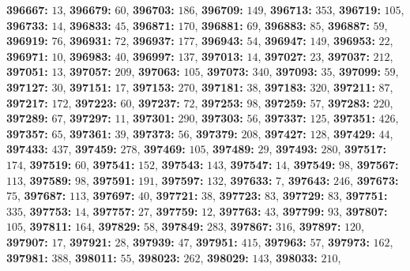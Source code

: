 \textsf{\bfseries 396667:} $13$, \textsf{\bfseries 396679:} $60$, \textsf{\bfseries 396703:} $186$, \textsf{\bfseries 396709:} $149$, \textsf{\bfseries 396713:} $353$, \textsf{\bfseries 396719:} $105$, \textsf{\bfseries 396733:} $14$, \textsf{\bfseries 396833:} $45$, \textsf{\bfseries 396871:} $170$, \textsf{\bfseries 396881:} $69$, \textsf{\bfseries 396883:} $85$, \textsf{\bfseries 396887:} $59$, \textsf{\bfseries 396919:} $76$, \textsf{\bfseries 396931:} $72$, \textsf{\bfseries 396937:} $177$, \textsf{\bfseries 396943:} $54$, \textsf{\bfseries 396947:} $149$, \textsf{\bfseries 396953:} $22$, \textsf{\bfseries 396971:} $10$, \textsf{\bfseries 396983:} $40$, \textsf{\bfseries 396997:} $137$, \textsf{\bfseries 397013:} $14$, \textsf{\bfseries 397027:} $23$, \textsf{\bfseries 397037:} $212$, \textsf{\bfseries 397051:} $13$, \textsf{\bfseries 397057:} $209$, \textsf{\bfseries 397063:} $105$, \textsf{\bfseries 397073:} $340$, \textsf{\bfseries 397093:} $35$, \textsf{\bfseries 397099:} $59$, \textsf{\bfseries 397127:} $30$, \textsf{\bfseries 397151:} $17$, \textsf{\bfseries 397153:} $270$, \textsf{\bfseries 397181:} $38$, \textsf{\bfseries 397183:} $320$, \textsf{\bfseries 397211:} $87$, \textsf{\bfseries 397217:} $172$, \textsf{\bfseries 397223:} $60$, \textsf{\bfseries 397237:} $72$, \textsf{\bfseries 397253:} $98$, \textsf{\bfseries 397259:} $57$, \textsf{\bfseries 397283:} $220$, \textsf{\bfseries 397289:} $67$, \textsf{\bfseries 397297:} $11$, \textsf{\bfseries 397301:} $290$, \textsf{\bfseries 397303:} $56$, \textsf{\bfseries 397337:} $125$, \textsf{\bfseries 397351:} $426$, \textsf{\bfseries 397357:} $65$, \textsf{\bfseries 397361:} $39$, \textsf{\bfseries 397373:} $56$, \textsf{\bfseries 397379:} $208$, \textsf{\bfseries 397427:} $128$, \textsf{\bfseries 397429:} $44$, \textsf{\bfseries 397433:} $437$, \textsf{\bfseries 397459:} $278$, \textsf{\bfseries 397469:} $105$, \textsf{\bfseries 397489:} $29$, \textsf{\bfseries 397493:} $280$, \textsf{\bfseries 397517:} $174$, \textsf{\bfseries 397519:} $60$, \textsf{\bfseries 397541:} $152$, \textsf{\bfseries 397543:} $143$, \textsf{\bfseries 397547:} $14$, \textsf{\bfseries 397549:} $98$, \textsf{\bfseries 397567:} $113$, \textsf{\bfseries 397589:} $98$, \textsf{\bfseries 397591:} $191$, \textsf{\bfseries 397597:} $132$, \textsf{\bfseries 397633:} $7$, \textsf{\bfseries 397643:} $246$, \textsf{\bfseries 397673:} $75$, \textsf{\bfseries 397687:} $113$, \textsf{\bfseries 397697:} $40$, \textsf{\bfseries 397721:} $38$, \textsf{\bfseries 397723:} $83$, \textsf{\bfseries 397729:} $83$, \textsf{\bfseries 397751:} $335$, \textsf{\bfseries 397753:} $14$, \textsf{\bfseries 397757:} $27$, \textsf{\bfseries 397759:} $12$, \textsf{\bfseries 397763:} $43$, \textsf{\bfseries 397799:} $93$, \textsf{\bfseries 397807:} $105$, \textsf{\bfseries 397811:} $164$, \textsf{\bfseries 397829:} $58$, \textsf{\bfseries 397849:} $283$, \textsf{\bfseries 397867:} $316$, \textsf{\bfseries 397897:} $120$, \textsf{\bfseries 397907:} $17$, \textsf{\bfseries 397921:} $28$, \textsf{\bfseries 397939:} $47$, \textsf{\bfseries 397951:} $415$, \textsf{\bfseries 397963:} $57$, \textsf{\bfseries 397973:} $162$, \textsf{\bfseries 397981:} $388$, \textsf{\bfseries 398011:} $55$, \textsf{\bfseries 398023:} $262$, \textsf{\bfseries 398029:} $143$, \textsf{\bfseries 398033:} $210$, 
